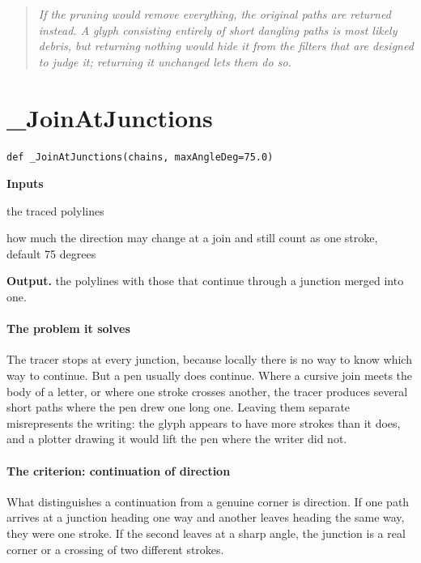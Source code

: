 \begin{quote}\small\itshape If the pruning would remove everything, the original paths are returned instead. A glyph consisting entirely of short dangling paths is most likely debris, but returning nothing would hide it from the filters that are designed to judge it; returning it unchanged lets them do so.\end{quote}

\section{\_JoinAtJunctions}
\begin{lstlisting}[style=sig]
def _JoinAtJunctions(chains, maxAngleDeg=75.0)
\end{lstlisting}

\noindent\textbf{Inputs}
\begin{description}[leftmargin=2.2em,style=nextline,font=\normalfont\ttfamily]\setlength\itemsep{1pt}
  \item[{chains}] \normalfont the traced polylines
  \item[{maxAngleDeg}] \normalfont how much the direction may change at a join and still count as one stroke, default 75 degrees
\end{description}

\noindent\textbf{Output.} the polylines with those that continue through a junction merged into one.


\paragraph{The problem it solves}
The tracer stops at every junction, because locally there is no way to know which way to continue. But a pen usually does continue. Where a cursive join meets the body of a letter, or where one stroke crosses another, the tracer produces several short paths where the pen drew one long one. Leaving them separate misrepresents the writing: the glyph appears to have more strokes than it does, and a plotter drawing it would lift the pen where the writer did not.


\paragraph{The criterion: continuation of direction}
What distinguishes a continuation from a genuine corner is direction. If one path arrives at a junction heading one way and another leaves heading the same way, they were one stroke. If the second leaves at a sharp angle, the junction is a real corner or a crossing of two different strokes.


